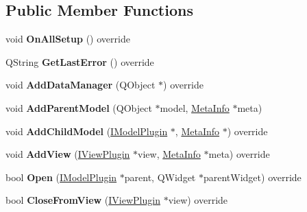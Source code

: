 \subsection*{Public Member Functions}
\begin{DoxyCompactItemize}
\item 
\mbox{\label{class_task_tree_model_aeef3183a88c527ffd51adf5c0753a5a2}} 
void {\bfseries On\+All\+Setup} () override
\item 
\mbox{\label{class_task_tree_model_a0300da8b58d57891e2287bb9e1cb9d90}} 
Q\+String {\bfseries Get\+Last\+Error} () override
\item 
\mbox{\label{class_task_tree_model_aa25870b721ec1b86b12e497ad8314e54}} 
void {\bfseries Add\+Data\+Manager} (Q\+Object $\ast$) override
\item 
\mbox{\label{class_task_tree_model_ae5e240226aeee8ec516546cd7ec34071}} 
void {\bfseries Add\+Parent\+Model} (Q\+Object $\ast$model, \hyperlink{struct_meta_info}{Meta\+Info} $\ast$meta)
\item 
\mbox{\label{class_task_tree_model_a62708172afa70e35dd504ee4bb190c06}} 
void {\bfseries Add\+Child\+Model} (\hyperlink{class_i_model_plugin}{I\+Model\+Plugin} $\ast$, \hyperlink{struct_meta_info}{Meta\+Info} $\ast$) override
\item 
\mbox{\label{class_task_tree_model_af7e15dbbbca38a174c248e110f5c2ab0}} 
void {\bfseries Add\+View} (\hyperlink{class_i_view_plugin}{I\+View\+Plugin} $\ast$view, \hyperlink{struct_meta_info}{Meta\+Info} $\ast$meta) override
\item 
\mbox{\label{class_task_tree_model_a7a2963fe56d9ef71711b7071dad49368}} 
bool {\bfseries Open} (\hyperlink{class_i_model_plugin}{I\+Model\+Plugin} $\ast$parent, Q\+Widget $\ast$parent\+Widget) override
\item 
\mbox{\label{class_task_tree_model_adb18285fd4cef22570af2d45b6e67d61}} 
bool {\bfseries Close\+From\+View} (\hyperlink{class_i_view_plugin}{I\+View\+Plugin} $\ast$view) override
\item 

\end{DoxyCompactItemize}
